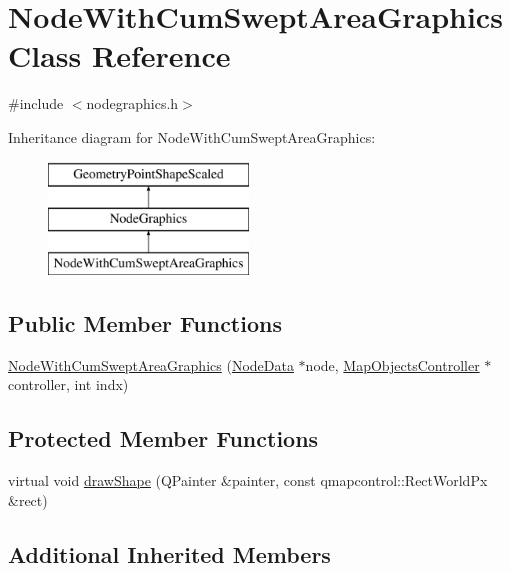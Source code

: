 \hypertarget{class_node_with_cum_swept_area_graphics}{}\section{Node\+With\+Cum\+Swept\+Area\+Graphics Class Reference}
\label{class_node_with_cum_swept_area_graphics}


{\ttfamily \#include $<$nodegraphics.\+h$>$}

Inheritance diagram for Node\+With\+Cum\+Swept\+Area\+Graphics\+:\begin{figure}[H]
\begin{center}
\leavevmode
\includegraphics[height=3.000000cm]{d2/d7c/class_node_with_cum_swept_area_graphics}
\end{center}
\end{figure}
\subsection*{Public Member Functions}
\begin{DoxyCompactItemize}
\item 
\mbox{\hyperlink{class_node_with_cum_swept_area_graphics_a22c915f8a07c06da7a96c20f7b881096}{Node\+With\+Cum\+Swept\+Area\+Graphics}} (\mbox{\hyperlink{class_node_data}{Node\+Data}} $\ast$node, \mbox{\hyperlink{class_map_objects_controller}{Map\+Objects\+Controller}} $\ast$controller, int indx)
\end{DoxyCompactItemize}
\subsection*{Protected Member Functions}
\begin{DoxyCompactItemize}
\item 
virtual void \mbox{\hyperlink{class_node_with_cum_swept_area_graphics_a0d9d25328fd66d29a72dabd7a40c8c43}{draw\+Shape}} (Q\+Painter \&painter, const qmapcontrol\+::\+Rect\+World\+Px \&rect)
\end{DoxyCompactItemize}
\subsection*{Additional Inherited Members}


